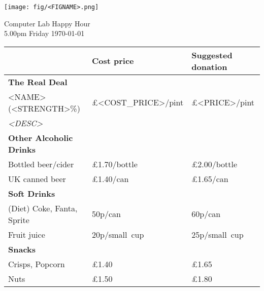 \documentclass[a4paper,12pt]{article}
\begin{document}
\thispagestyle{empty}

\begin{center}
	\texttt{[image: fig/<FIGNAME>.png]} \par \bigskip \bigskip \bigskip
    {\Large Computer Lab Happy Hour} \\ \smallskip
    {5.00pm Friday \today}
\end{center}

\bigskip

\large
\begin{center}

\def\arraystretch{1.1}

\begin{tabular}{p{7.5cm}|p{3cm}|p{3cm}} & \textbf{Cost price} & \textbf{Suggested donation} \\
\hline
\textbf{The Real Deal} & & \\
<NAME> (<STRENGTH>\%) & \pounds <COST_PRICE>/pint & \pounds <PRICE>/pint \\
\small \it <DESC> \medskip & & \\

\hline
{\bf Other Alcoholic Drinks} & & \\
Bottled beer/cider & \pounds 1.70/bottle & \pounds 2.00/bottle \\
UK canned beer & \pounds 1.40/can & \pounds 1.65/can \medskip \\

\hline
{\bf Soft Drinks} &&\\
(Diet) Coke, Fanta, Sprite & 50p/can  & 60p/can \\
Fruit juice & 20p/small~cup & 25p/small~cup \medskip \\

\hline
{\bf Snacks} & & \\
Crisps, Popcorn &\pounds 1.40 &\pounds 1.65 \\
Nuts &\pounds 1.50 &\pounds 1.80 \\

\end{tabular}
\end{center}
\end{document}
